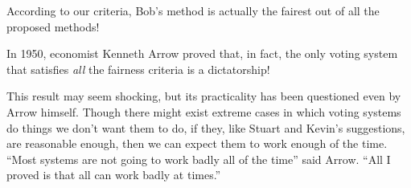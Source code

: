 \documentclass{article}
\begin{document}
According to our criteria, Bob’s method is actually the fairest out of all the proposed methods! 

In 1950, economist Kenneth Arrow proved that, in fact, the only voting system that satisfies \textit{all} the fairness criteria is a dictatorship! 

This result may seem shocking, but its practicality has been questioned even by Arrow himself. Though there might exist extreme cases in which voting systems do things we don’t want them to do, if they, like Stuart and Kevin’s suggestions, are reasonable enough, then we can expect them to work enough of the time. ``Most systems are not going to work badly all of the time” said Arrow. ``All I proved is that all can work badly at times.”
\end{document}
